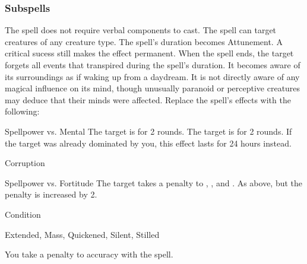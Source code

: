 \subsubsection{Subspells}
The spell does not require verbal components to cast.
The spell can target creatures of any creature type.
The spell's duration becomes Attunement.
A critical sucess still makes the effect permanent.
When the spell ends, the target forgets all events that transpired during the spell's duration.
It becomes aware of its surroundings as if waking up from a daydream.
It is not directly aware of any magical influence on its mind, though unusually paranoid or perceptive creatures may deduce that their minds were affected.
Replace the spell's effects with the following:
\begin{spellcontent}
\begin{augmenteffects}
\begin{spellattack}{Spellpower vs. Mental}
\spellsuccess The target is \confused for 2 rounds.
\spellcritical
The target is \dominated for 2 rounds.
If the target was already dominated by you, this effect lasts for 24 hours instead.
\end{spellattack}
\end{augmenteffects}
\end{spellcontent}
\begin{spellsection}{Corruption}
\begin{spellheader}
\end{spellheader}
\begin{spellcontent}
\begin{spelltargetinginfo}
\end{spelltargetinginfo}
\begin{spelleffects}
\begin{spellattack}{Spellpower vs. Fortitude}
\spellsuccess
The target takes a  penalty to , , and .
\spellcritical
As above, but the penalty is increased by 2.
\end{spellattack}
\spelldur Condition
\end{spelleffects}
\end{spellcontent}
\begin{spellfooter}
 Extended, Mass, Quickened, Silent, Stilled
\end{spellfooter}
\begin{spellsubcontent}
\begin{spellcantrip}
You take a  penalty to accuracy with the spell.
\end{spellcantrip}
\end{spellsubcontent}
\end{spellsection}

